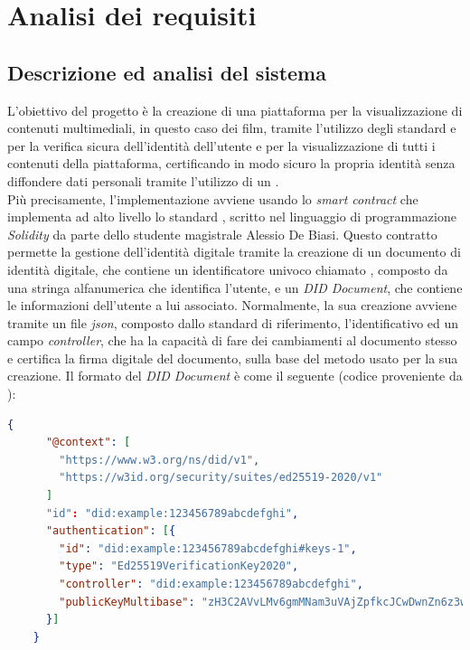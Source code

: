 \chapter{Analisi dei requisiti}
\label{cap:analisi-requisiti}


\section{Descrizione ed analisi del sistema} \label{sec:analisi-sistema}
L'obiettivo del progetto è la creazione di una piattaforma per la visualizzazione di contenuti multimediali, in questo caso dei film,
tramite l'utilizzo degli standard   e  per la verifica sicura dell'identità dell'utente e per la 
visualizzazione di tutti i contenuti della piattaforma, certificando in modo sicuro la propria identità senza diffondere dati personali tramite 
l'utilizzo di un .\\

Più precisamente, l'implementazione avviene usando lo \textit{smart contract} che implementa ad alto livello lo standard , 
scritto nel linguaggio di programmazione \textit{Solidity} da parte dello studente magistrale Alessio De Biasi.
Questo contratto permette la gestione dell'identità digitale tramite la creazione di un documento di identità digitale, che contiene un identificatore univoco
chiamato , composto da una stringa alfanumerica che identifica l'utente, e un \textit{DID Document}, che contiene le informazioni dell'utente a lui associato.
Normalmente, la sua creazione avviene tramite un file \textit{json}, composto dallo standard di riferimento, l'identificativo ed un campo \textit{controller},
che ha la capacità di fare dei cambiamenti al documento stesso e certifica la firma digitale del documento, sulla base del metodo usato per la sua creazione.
Il formato del \textit{DID Document} è come il seguente (codice proveniente da \cite{site:didw3c}):

\begin{lstlisting}[language=json]
    {
      "@context": [
        "https://www.w3.org/ns/did/v1",
        "https://w3id.org/security/suites/ed25519-2020/v1"
      ]
      "id": "did:example:123456789abcdefghi",
      "authentication": [{    
        "id": "did:example:123456789abcdefghi#keys-1",
        "type": "Ed25519VerificationKey2020",
        "controller": "did:example:123456789abcdefghi",
        "publicKeyMultibase": "zH3C2AVvLMv6gmMNam3uVAjZpfkcJCwDwnZn6z3wXmqPV"
      }]
    }
\end{lstlisting}

